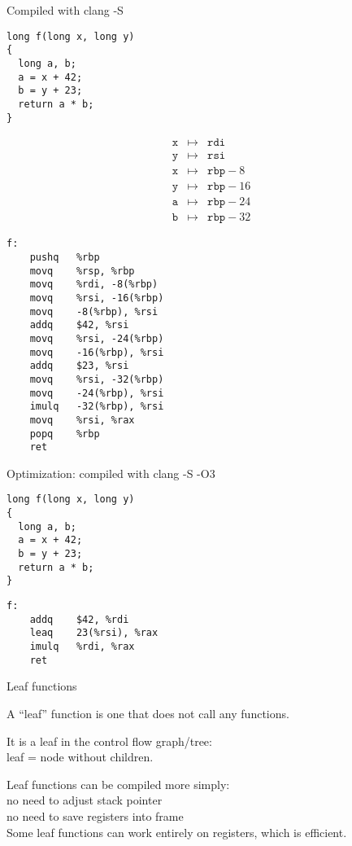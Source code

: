 \documentclass[landscape]{beamer}
\begin{document}
\begin{frame}[fragile]{Compiled with clang -S}
\begin{minipage}{.55\textwidth}
\begin{verbatim}
long f(long x, long y)
{
  long a, b;
  a = x + 42;
  b = y + 23;
  return a * b;
}
\end{verbatim}

\begin{eqnarray*}
\texttt x&\mapsto& \texttt{rdi}
\\
\texttt y&\mapsto& \texttt{rsi}
\\
\texttt x&\mapsto& \texttt{rbp}-8
\\
\texttt y&\mapsto& \texttt{rbp}-16 
\\
\texttt a&\mapsto& \texttt{rbp}-24
\\
\texttt b&\mapsto& \texttt{rbp}-32
\end{eqnarray*}

\end{minipage}
%
\begin{minipage}{.4\textwidth}
\begin{verbatim}
f:
	pushq	%rbp
	movq	%rsp, %rbp
	movq	%rdi, -8(%rbp)
	movq	%rsi, -16(%rbp)
	movq	-8(%rbp), %rsi
	addq	$42, %rsi
	movq	%rsi, -24(%rbp)
	movq	-16(%rbp), %rsi
	addq	$23, %rsi
	movq	%rsi, -32(%rbp)
	movq	-24(%rbp), %rsi
	imulq	-32(%rbp), %rsi
	movq	%rsi, %rax
	popq	%rbp
	ret
\end{verbatim}
\end{minipage}
\end{frame}



\begin{frame}[fragile]{Optimization: compiled with clang -S -O3}
\begin{minipage}{.5\textwidth}
\begin{verbatim}
long f(long x, long y)
{
  long a, b;
  a = x + 42;
  b = y + 23;
  return a * b;
}
\end{verbatim}
\end{minipage}
%
\begin{minipage}{.4\textwidth}
\begin{verbatim}
f:                                      
	addq	$42, %rdi
	leaq	23(%rsi), %rax
	imulq	%rdi, %rax
	ret
\end{verbatim}
\end{minipage}
\end{frame}

\begin{frame}{Leaf functions}

A ``leaf'' function is one that does not call any functions.

It is a leaf in the control flow graph/tree: 
\\
leaf = node without children.

Leaf functions can be compiled more simply:
\\
no need to adjust stack pointer
\\
no need to save registers into frame
\\
Some leaf functions can work entirely on registers, which is efficient.
\end{frame}
\end{document}

